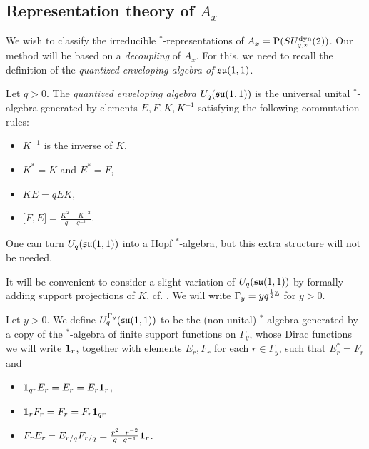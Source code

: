 \subsection{Representation theory of $A_x$}

We wish to classify the irreducible $^*$-representations of $A_x= \operatorname{\mathrm{P}}(SU_{q,x}^{\operatorname{\mathrm{dyn}}}(2))$. Our method will be based on a \emph{decoupling} of $A_x$. For this, we need to recall the definition of the \emph{quantized enveloping algebra of $\mathfrak{su}(1,1)$}. %

\begin{Def} Let $q>0$. The \emph{quantized enveloping algebra $U_q(\mathfrak{su}(1,1))$} is the universal unital $^*$-algebra generated by elements $E,F,K,K^{-1}$ satisfying the following commutation rules: 
\begin{itemize}
\item $K^{-1}$ is the inverse of $K$, 
\item $K^* = K$ and $E^* = F$, 
\item $KE = qEK$,
\item $\lbrack F,E\rbrack = \frac{K^2-K^{-2}}{q-q^{-1}}$.
\end{itemize}
\end{Def}

One can turn $U_q(\mathfrak{su}(1,1))$ into a Hopf $^*$-algebra, but this extra structure will not be needed. 

It will be convenient to consider a slight variation of $U_q(\mathfrak{su}(1,1))$ by formally adding support projections of $K$, cf. \cite[Chapter 23]{Lus1}. We will write $\Gamma_y = yq^{\frac{1}{2}\mathbb{Z}}$  for $y>0$.

\begin{Def} Let $y>0$. We define $U_q^{\Gamma_y}(\mathfrak{su}(1,1))$ to be the (non-unital) $^*$-algebra generated by a copy of the $^*$-algebra of finite support functions on $\Gamma_y$, whose Dirac functions we will write $\mathbf{1}_r$, together with elements $E_{r},F_r$ for each $r\in \Gamma_y$, such that $E_{r}^* = F_{r}$ and 
\begin{itemize}
\item $\mathbf{1}_{qr}E_{r} = E_{r} = E_{r}\mathbf{1}_{r}$, 
\item $\mathbf{1}_r F_r = F_r  = F_r\mathbf{1}_{qr}$
\item $F_{r}E_{r} - E_{r/q}F_{r/q}  = \frac{r^2-r^{-2}}{q-q^{-1}} \mathbf{1}_{r}$.
\end{itemize}
\end{Def} 

